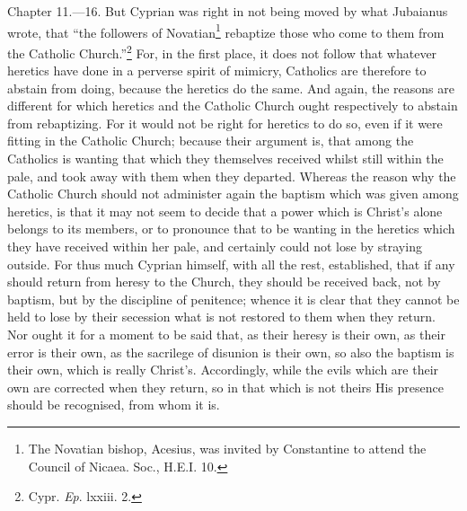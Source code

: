 Chapter 11.—16. But Cyprian was right in not being moved by what Jubaianus wrote, that ``the followers of Novatian\footnote{\par  The Novatian bishop, Acesius, was invited by Constantine to attend the Council of Nicaea. Soc., H.E.I. 10.} rebaptize those who come to them from the Catholic Church.''\footnote{\par  Cypr. \emph{Ep}. lxxiii. 2.} For, in the first place, it does not follow that whatever heretics have done in a perverse spirit of mimicry, Catholics are therefore to abstain from doing, because the heretics do the same. And again, the reasons are different for which heretics and the Catholic Church ought respectively to abstain from rebaptizing. For it would not be right for heretics to do so, even if it were fitting in the Catholic Church; because their argument is, that among the Catholics is wanting that which they themselves received whilst still within the pale, and took away with them when they departed. Whereas the reason why the Catholic Church should not administer again the baptism which was given among heretics, is that it may not seem to decide that a power which is Christ’s alone belongs to its members, or to pronounce that to be wanting in the heretics which they have received within her pale, and certainly could not lose by straying outside. For thus much Cyprian himself, with all the rest, established, that if any should return from heresy to the Church, they should be received back, not by baptism, but by the discipline of penitence; whence it is clear that they cannot be held to lose by their secession what is not restored to them when they return. Nor ought it for a moment to be said that, as their heresy is their own, as their error is their own, as the sacrilege of disunion is their own, so also the baptism is their own, which is really Christ’s. Accordingly, while the evils which are their own are corrected when they return, so in that which is not theirs His presence should be recognised, from whom it is.


